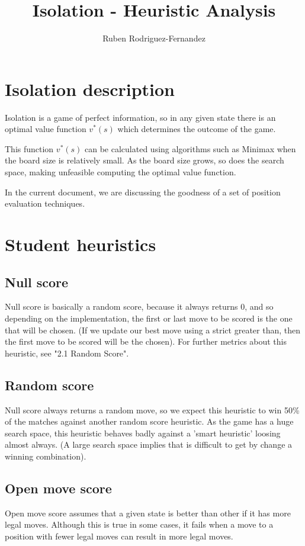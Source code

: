 \documentclass[10pt,a4paper]{article}
\title{Isolation - Heuristic Analysis}
\author{Ruben Rodriguez-Fernandez}
\begin{document}
\maketitle
\noindent

\section{Isolation description}
Isolation is a game of perfect information, so in any given state there is an optimal value function $v^{*}(s)$ which determines the outcome of the game.\newline

This function $v^{*}(s)$ can be calculated using algorithms such as Minimax when the board
size is relatively small. As the board size grows, so does the search space, making unfeasible computing the optimal value function.\newline

In the current document, we are discussing the goodness of a set of position evaluation techniques.

\section{Student heuristics}


\subsection{Null score}
Null score is basically a random score, because it always returns 0, and so depending on the implementation, the first or last move to be scored is the one that will be chosen. (If we update our best move using a strict greater than, then the first move to be scored will be the chosen). For further metrics about this heuristic, see "2.1 Random Score".

\subsection{Random score}
Null score always returns a random move, so we expect this heuristic to win 50\% of the matches against another random score heuristic. As the game has a huge search space, this heuristic behaves badly against a 'smart heuristic' loosing almost always. (A large search space implies that is difficult to get by change a winning combination).\newline

\subsection{Open move score}
Open move score assumes that a given state is better than other if it has more legal moves. Although this is true in some cases, it fails when a move to a position with fewer legal moves can result in more legal moves.\newline
\end{document}

